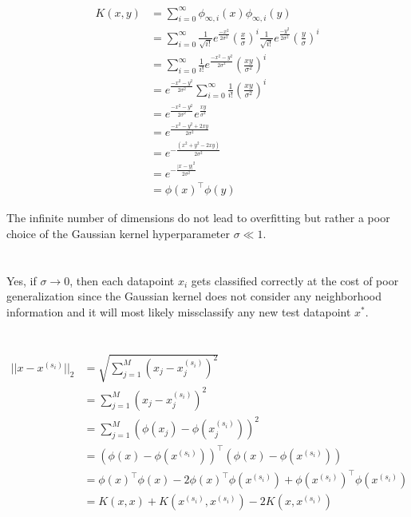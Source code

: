\documentclass[11pt]{article}
\newcommand{\exercise}{\section{}}
\newcommand{\sumf}[3]{\sum_{#1}^{#2} #3}
\newcommand{\tf}[1]{{#1}^{\intercal}}
\begin{document}
\begin{align*}
K(x, y) &= \sumf{i=0}{\infty}{ \phi_{\infty, i}(x) \phi_{\infty, i}(y) } \\
&= \sumf{i=0}{ \infty }{ \frac{1}{ \sqrt{i!} } e^{ \frac{ -x^2 }{ 2\sigma^2 } } ( \frac{ x }{ \sigma } )^i  \frac{1}{ \sqrt{i!} } e^{ \frac{ -y^2 }{ 2\sigma^2 } } ( \frac{ y }{ \sigma } )^i} \\
&= \sumf{i=0}{ \infty }{ \frac{1}{ i! } e^{ \frac{ -x^2 -y^2 }{ 2\sigma^2 } } ( \frac{ x y }{ \sigma^2 } )^i } \\
&= e^{ \frac{ -x^2 -y^2 }{ 2\sigma^2 } } \sumf{i=0}{ \infty }{ \frac{1}{ i! }  ( \frac{ x y }{ \sigma^2 } )^i } \tag{by Taylor series of $e^z$} \\
&= e^{ \frac{ -x^2 -y^2 }{ 2\sigma^2 } } e^{ \frac{ x y }{ \sigma^2 } } \\
&= e^{ \frac{ -x^2 -y^2  + 2xy }{ 2\sigma^2 } }  \\
&= e^{ - \frac{ (x^2 + y^2  - 2xy) }{ 2\sigma^2 } }  \\
&= e^{ - \frac{ | x - y |^2 }{ 2\sigma^2 } }  \tag{by definition Gaussian Kernel } \\
&= \tf{\phi(x)} \phi(y)
\end{align*}

The infinite number of dimensions do not lead to overfitting but rather a poor choice of the Gaussian kernel hyperparameter $\sigma  \ll 1$.

\exercise

Yes, if $\sigma  \rightarrow 0$, then each datapoint $x_i$ gets classified correctly at the cost of poor generalization since the Gaussian kernel does not consider any neighborhood information and it will most likely missclassify any new test datapoint $x^*$.

\exercise

\begin{align*}
|| x - x^{(s_i)} ||_2 &= \sqrt{\sumf{j = 1}{M}{(x_j - x_j^{(s_i)})^2}} \\
&= \sumf{j = 1}{M}{(x_j - x_j^{(s_i)})^2} \tag{squared distance does not change k nearest neighbors of $x$} \\
&= \sumf{j = 1}{M}{(\phi(x_j) - \phi(x_j^{(s_i)}))^2} \tag{ by feature map $\phi(x)$ } \\
&= \tf{(\phi(x) - \phi(x^{(s_i)}))} (\phi(x) - \phi(x^{(s_i)})) \\
&= \tf{\phi(x)} \phi(x) - 2 \tf{ \phi(x) }  \phi(x^{(s_i)}) + \tf{ \phi(x^{(s_i)}) }  \phi(x^{(s_i)}) \\
&= K(x, x)  + K(x^{(s_i)}, x^{(s_i)}) - 2 K(x, x^{(s_i)})
\end{align*}
\end{document}
